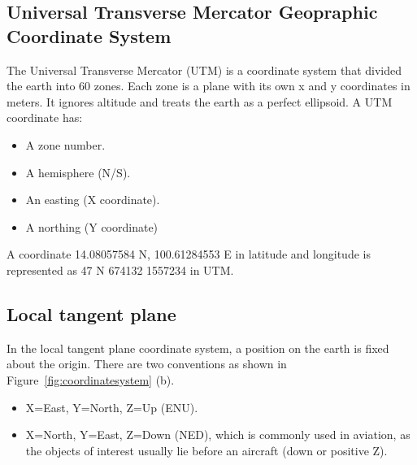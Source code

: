 \subsection{Universal Transverse Mercator Geopraphic Coordinate System}
The Universal Transverse Mercator (UTM) is a coordinate system that divided the earth into 60 zones. Each zone is a plane with its own x and y coordinates in meters. It ignores altitude and treats the earth as a perfect ellipsoid. A UTM coordinate has:

\begin{itemize}
        \item A zone number.
        \item A hemisphere (N/S).
        \item An easting (X coordinate).
        \item A northing (Y coordinate)
\end{itemize}

A coordinate 14.08057584 \degree N, 100.61284553 \degree E in latitude and longitude is represented as 47 N 674132 1557234 in UTM.

\subsection{Local tangent plane}

In the local tangent plane coordinate system, a position on the earth is fixed about the origin. There are two conventions as shown in Figure~\ref{fig:coordinatesystem} (b).

\begin{itemize}
	\item X=East, Y=North, Z=Up (ENU).
	\item X=North, Y=East, Z=Down (NED), which is commonly used in aviation, as the objects of interest usually lie before an aircraft (down or positive Z).
\end{itemize}

